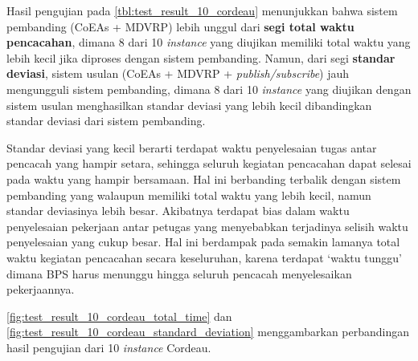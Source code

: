 Hasil pengujian pada \autoref{tbl:test_result_10_cordeau} menunjukkan bahwa sistem pembanding (CoEAs + MDVRP) lebih unggul dari \textbf{segi total waktu pencacahan}, dimana 8 dari 10 \textit{instance} yang diujikan memiliki total waktu yang lebih kecil jika diproses dengan sistem pembanding. Namun, dari segi \textbf{standar deviasi}, sistem usulan (CoEAs + MDVRP + \textit{publish/subscribe}) jauh mengungguli sistem pembanding, dimana 8 dari 10 \textit{instance} yang diujikan dengan sistem usulan menghasilkan standar deviasi yang lebih kecil dibandingkan standar deviasi dari sistem pembanding. 

Standar deviasi yang kecil berarti terdapat waktu penyelesaian tugas antar pencacah yang hampir setara, sehingga seluruh kegiatan pencacahan dapat selesai pada waktu yang hampir bersamaan. Hal ini berbanding terbalik dengan sistem pembanding yang walaupun memiliki total waktu yang lebih kecil, namun standar deviasinya lebih besar. Akibatnya terdapat bias dalam waktu penyelesaian pekerjaan antar petugas yang menyebabkan terjadinya selisih waktu penyelesaian yang cukup besar. Hal ini berdampak pada semakin lamanya total waktu kegiatan pencacahan secara keseluruhan, karena terdapat `waktu tunggu' dimana BPS harus menunggu hingga seluruh pencacah menyelesaikan pekerjaannya. 


\autoref{fig:test_result_10_cordeau_total_time} dan \autoref{fig:test_result_10_cordeau_standard_deviation} menggambarkan perbandingan hasil pengujian dari 10 \textit{instance} Cordeau.


